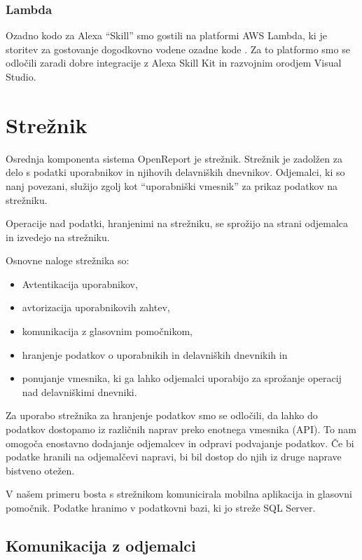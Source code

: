 \documentclass[a4paper, 12pt]{book}
\begin{document}
\subsubsection{Lambda}

Ozadno kodo za Alexa \enquote{Skill} smo gostili na platformi AWS Lambda, ki je storitev za gostovanje dogodkovno vodene ozadne kode \cite{lambda}.
Za to platformo smo se odločili zaradi dobre integracije z Alexa Skill Kit in razvojnim orodjem Visual Studio.

\section{Strežnik}

Osrednja komponenta sistema OpenReport je strežnik.
Strežnik je zadolžen za delo s podatki uporabnikov in njihovih delavniških dnevnikov.
Odjemalci, ki so nanj povezani, služijo zgolj kot \enquote{uporabniški vmesnik} za prikaz podatkov na strežniku.

Operacije nad podatki, hranjenimi na strežniku, se sprožijo na strani odjemalca in izvedejo na strežniku.

Osnovne naloge strežnika so:
\begin{itemize}
	\item Avtentikacija uporabnikov,
	\item avtorizacija uporabnikovih zahtev,
	\item komunikacija z glasovnim pomočnikom,
	\item hranjenje podatkov o uporabnikih in delavniških dnevnikih in
	\item ponujanje vmesnika, ki ga lahko odjemalci uporabijo za sprožanje operacij nad delavniškimi dnevniki.
\end{itemize}

Za uporabo strežnika za hranjenje podatkov smo se odločili, da lahko do podatkov dostopamo iz različnih naprav preko enotnega vmesnika (API).
To nam omogoča enostavno dodajanje odjemalcev in odpravi podvajanje podatkov.
Če bi podatke hranili na odjemalčevi napravi, bi bil dostop do njih iz druge naprave bistveno otežen.

V našem primeru bosta s strežnikom komunicirala mobilna aplikacija in glasovni pomočnik.
Podatke hranimo v podatkovni bazi, ki jo streže SQL Server.

\subsection{Komunikacija z odjemalci}
\end{document}
